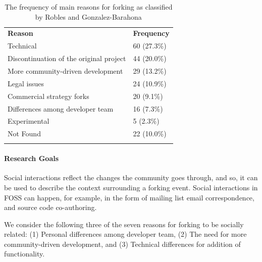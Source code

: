 \documentclass[12pt]{report}
\begin{document}
\begin{table}[!ht]
\centering
\caption[The frequency of main reasons for forking]{The frequency of main reasons for forking as classified by Robles and Gonzalez-Barahona \cite{Robles}}
\label{tableReasonsForForkingFrequency}
\begin{tabular}{p{} p{}}
\hline\noalign{\smallskip}
\textbf{Reason} & \textbf{Frequency} \\
\noalign{\smallskip}\hline\noalign{\smallskip}
Technical & 60 (27.3\%)\\ \hline
Discontinuation of the original project & 44 (20.0\%)  \\ \hline
More community-driven development & 29 (13.2\%) \\ \hline
Legal issues &  24 (10.9\%) \\ \hline
Commercial strategy forks &  20 (9.1\%)  \\ \hline
Differences among developer team &  16 (7.3\%)  \\ \hline
Experimental &  5  (2.3\%) \\ \hline
Not Found &  22 (10.0\%) \\ 
\noalign{\smallskip}\hline
\end{tabular}
\end{table}

\paragraph{Research Goals}
\label{ResearchGoals}
\label{ResearchObjective}

Social interactions reflect the changes the community goes through, and so, it can be used to describe the context surrounding a forking event. Social interactions in FOSS can happen, for example, in the form of mailing list email correspondence, and source code co-authoring. 

We consider the following three of the seven reasons for forking \cite{Robles} to be socially related: (1) Personal differences among developer team, (2) The need for more community-driven development, and (3) Technical differences for addition of functionality. 
\end{document}
